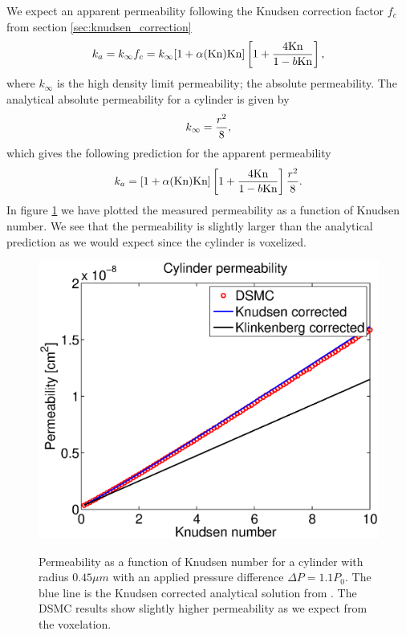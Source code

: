 We expect an apparent permeability following the Knudsen correction factor $f_c$ from section \ref{sec:knudsen_correction}
\begin{align}
	k_a = k_\infty f_c = k_\infty[1 + \alpha(\text{Kn})\text{Kn}]\left[1 + {4\text{Kn}\over 1 - b\text{Kn}}\right],
\end{align}
where $k_\infty$ is the high density limit permeability; the absolute permeability. The analytical absolute permeability for a cylinder is given by\cite{karniadakis2005microflows}
\begin{align}
	\label{eq:permeability_cylinder}
	k_\infty = {r^2\over 8},
\end{align}
which gives the following prediction for the apparent permeability
\begin{align}
	k_a = [1 + \alpha(\text{Kn})\text{Kn}]\left[1 + {4\text{Kn}\over 1 - b\text{Kn}}\right] {r^2\over 8}.
\end{align}
In figure \ref{fig:one_cylinder_varying_knudsen} we have plotted the measured permeability as a function of Knudsen number. We see that the permeability is slightly larger than the analytical prediction as we would expect since the cylinder is voxelized.

\begin{figure}[h]
\begin{center}
\includegraphics[width=\textwidth, trim=0cm 0cm 0cm 0cm, clip]{DSMC/figures/cylinder_knudsen_permeability.eps}
\label{fig:one_cylinder_varying_knudsen}
\end{center}
\caption{Permeability as a function of Knudsen number for a cylinder with radius $0.45 \mu m$ with an applied pressure difference $\Delta P = 1.1P_0$. The blue line is the Knudsen corrected analytical solution from \cite{karniadakis2005microflows}. The DSMC results show slightly higher permeability as we expect from the voxelation.}
\end{figure}

